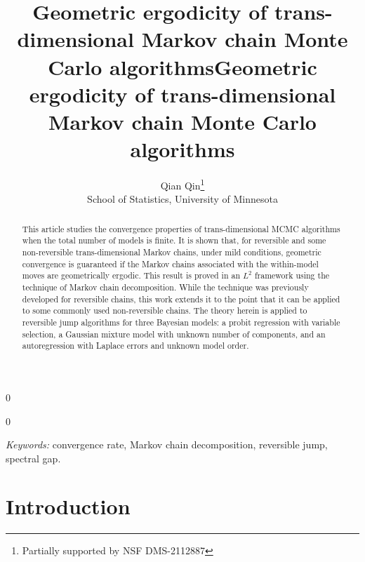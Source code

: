\documentclass[12pt]{article}
\newcommand{\blind}{0}
\begin{document}
%

\def\spacingset#1{\renewcommand{\baselinestretch}%
{#1}\small\normalsize} \spacingset{1}



\blind
{
  \title{\bf Geometric ergodicity of trans-dimensional Markov chain Monte Carlo algorithms}
  \author{}
  \maketitle
} \fi

\blind
{
  \title{\bf Geometric ergodicity of trans-dimensional Markov chain Monte Carlo algorithms}
  \author{Qian Qin\thanks{
  		Partially supported by NSF DMS-2112887}\hspace{.2cm}\\
  	School of Statistics, University of Minnesota}
  \maketitle
} \fi

\bigskip
\begin{abstract}
This article studies the convergence properties of trans-dimensional MCMC algorithms when the total number of models is finite.
It is shown that, for reversible and some non-reversible trans-dimensional Markov chains, under mild conditions, geometric convergence is guaranteed if the Markov chains associated with the within-model moves are geometrically ergodic.
This result is proved in an $L^2$ framework using the technique of Markov chain decomposition.
While the technique was previously developed for reversible chains, this work extends it to the point that it can be applied to some commonly used non-reversible chains.
The theory herein is applied to reversible jump algorithms for three Bayesian models: a probit regression with variable selection, a Gaussian mixture model with unknown number of components, and an autoregression with Laplace errors and unknown model order.
\end{abstract}

\noindent%
{\it Keywords:}  convergence rate, Markov chain decomposition, reversible jump, spectral gap.
\vfill

\newpage
\spacingset{1.9} %

	\section{Introduction} \label{sec:intro}
\end{document}

